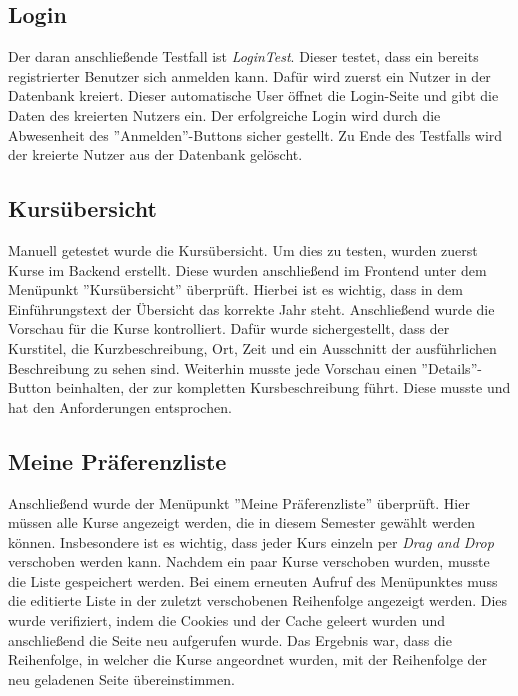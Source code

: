 		\subsection{Login}
			Der daran anschließende Testfall ist \textit{LoginTest}.
			Dieser testet, dass ein bereits registrierter Benutzer sich anmelden kann.
			Dafür wird zuerst ein Nutzer in der Datenbank kreiert.
			Dieser automatische User öffnet die Login-Seite und gibt die Daten des kreierten Nutzers ein.
			Der erfolgreiche Login wird durch die Abwesenheit des ''Anmelden''-Buttons sicher gestellt.
			Zu Ende des Testfalls wird der kreierte Nutzer aus der Datenbank gelöscht.\newline
		
		\subsection{Kursübersicht}
			Manuell getestet wurde die Kursübersicht.
			Um dies zu testen, wurden zuerst Kurse im Backend erstellt.
			Diese wurden anschließend im Frontend unter dem Menüpunkt ''Kursübersicht'' überprüft.
			Hierbei ist es wichtig, dass in dem Einführungstext der Übersicht das korrekte Jahr steht.
			Anschließend wurde die Vorschau für die Kurse kontrolliert.
			Dafür wurde sichergestellt, dass der Kurstitel, die Kurzbeschreibung, Ort, Zeit und ein Ausschnitt der ausführlichen Beschreibung zu sehen sind.
			Weiterhin musste jede Vorschau einen ''Details''-Button beinhalten, der zur kompletten Kursbeschreibung führt.
			Diese musste und hat den Anforderungen entsprochen.\newline
		
		\subsection{Meine Präferenzliste}
			Anschließend wurde der Menüpunkt ''Meine Präferenzliste'' überprüft.
			Hier müssen alle Kurse angezeigt werden, die in diesem Semester gewählt werden können.
			Insbesondere ist es wichtig, dass jeder Kurs einzeln per \textit{Drag and Drop} verschoben werden kann.
			Nachdem ein paar Kurse verschoben wurden, musste die Liste gespeichert werden.\newline
			Bei einem erneuten Aufruf des Menüpunktes muss die editierte Liste in der zuletzt verschobenen Reihenfolge angezeigt werden.
			Dies wurde verifiziert, indem die Cookies und der Cache geleert wurden und anschließend die Seite neu aufgerufen wurde.
			Das Ergebnis war, dass die Reihenfolge, in welcher die Kurse angeordnet wurden, mit der Reihenfolge der neu geladenen Seite übereinstimmen.\newline
		
